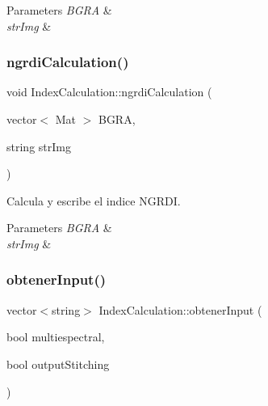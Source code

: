\begin{DoxyParams}{Parameters}
{\em B\+G\+RA} & \\
\hline
{\em str\+Img} & \\
\hline
\end{DoxyParams}
\mbox{\label{classIndexCalculation_ae42cea9b3bb253446995a80ae01ff429}} 
\subsubsection{\texorpdfstring{ngrdi\+Calculation()}{ngrdiCalculation()}}
{\footnotesize\ttfamily void Index\+Calculation\+::ngrdi\+Calculation (\begin{DoxyParamCaption}\item[{vector$<$ Mat $>$}]{B\+G\+RA,  }\item[{string}]{str\+Img }\end{DoxyParamCaption})\hspace{0.3cm}{\ttfamily [inline]}}



Calcula y escribe el indice N\+G\+R\+DI. 


\begin{DoxyParams}{Parameters}
{\em B\+G\+RA} & \\
\hline
{\em str\+Img} & \\
\hline
\end{DoxyParams}
\mbox{\label{classIndexCalculation_a65a88228b2caf575cbbac793a03d1dd6}} 
\subsubsection{\texorpdfstring{obtener\+Input()}{obtenerInput()}}
{\footnotesize\ttfamily vector$<$string$>$ Index\+Calculation\+::obtener\+Input (\begin{DoxyParamCaption}\item[{bool}]{multiespectral,  }\item[{bool}]{output\+Stitching }\end{DoxyParamCaption})\hspace{0.3cm}{\ttfamily [inline]}}



